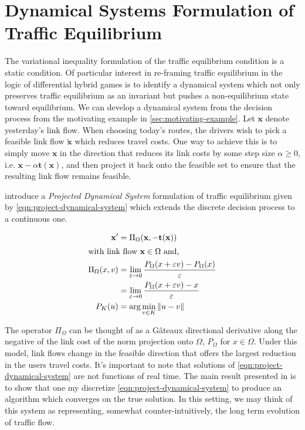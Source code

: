 \section{Dynamical Systems Formulation of Traffic Equilibrium}

The variational inequality formulation of the traffic equilibrium condition is a static condition.
Of particular interest in re-framing traffic equilibrium in the logic of differential hybrid games is to identify a dynamical system which not only preserves traffic equilibrium as an invariant but pushes a non-equilibrium state toward equilibrium.
We can develop a dynamical system from the decision process from the motivating example in \cref{sec:motivating-example}.
Let $\mathbf{x}$ denote yesterday's link flow.
When choosing today's routes, the drivers wish to pick a feasible link flow $\mathbf{\tilde{x}}$ which reduces travel costs.
One way to achieve this is to simply move $\mathbf{x}$ in the direction that reduces its link costs by some step size $\alpha \geq 0$, i.e. $\mathbf{x}-\alpha \mathbf{t}(\mathbf{x})$, and then project it back onto the feasible set to ensure that the resulting link flow remains feasible.

\citet{nagurney1997projected} introduce a \textit{Projected Dynamical System} formulation of traffic equilibrium given by \eqref{eqn:project-dynamical-system} which extends the discrete decision process to a continuous one.

\begin{align}
    \mathbf{x}' &= \Pi_{\Omega}(\mathbf{x}, -\mathbf{t}(\mathbf{x}))\label{eqn:project-dynamical-system}\\
    \intertext{with link flow $\mathbf{x} \in \Omega$ and,}
    \Pi_{\Omega}(x, v) &= \lim_{\varepsilon\to 0}\frac{P_{\Omega}(x + \varepsilon v) - P_{\Omega}(x)}{\varepsilon}\\
        &= \lim_{\varepsilon\to 0}\frac{P_{\Omega}(x + \varepsilon v) - x}{\varepsilon}\\
    P_{K}(u) &= \arg\min_{v\in K} \| u-v\|
\end{align}

The operator $\Pi_{\Omega}$ can be thought of as a G\^{a}teaux directional derivative along the negative of the link cost of the norm projection onto $\Omega$, $P_{\Omega}$ for $x\in \Omega$.
Under this model, link flows change in the feasible direction that offers the largest reduction in the users travel costs.
It's important to note that solutions of \eqref{eqn:project-dynamical-system} are not functions of real time.
The main result presented in \citet{nagurney1997projected} is to show that one my discretize \eqref{eqn:project-dynamical-system} to produce an algorithm which converges on the true solution.
In this setting, we may think of this system as representing, somewhat counter-intuitively, the long term evolution of traffic flow.

